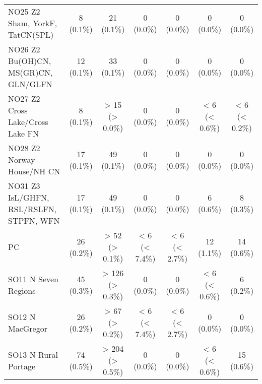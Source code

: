 \documentclass{article}
\begin{document}
\begin{table}[htbp]
\begin{longtable}{l*{6}{c}}
  NO25 Z2 Sham, YorkF, TatCN(SPL)                       &            8 (0.1\%)            &            21 (0.1\%)           &            0 (0.0\%)            &            0 (0.0\%)            &            0 (0.0\%)            &            0 (0.0\%)            \\
  NO26 Z2 Bu(OH)CN, MS(GR)CN, GLN/GLFN                  &            12 (0.1\%)           &            33 (0.1\%)           &            0 (0.0\%)            &            0 (0.0\%)            &            0 (0.0\%)            &            0 (0.0\%)            \\
  NO27 Z2 Cross Lake/Cross Lake FN                      &            8 (0.1\%)            &          > 15 (> 0.0\%)         &            0 (0.0\%)            &            0 (0.0\%)            &          < 6 (< 0.6\%)          &          < 6 (< 0.2\%)          \\
  NO28 Z2 Norway House/NH CN                            &            17 (0.1\%)           &            49 (0.1\%)           &            0 (0.0\%)            &            0 (0.0\%)            &            0 (0.0\%)            &            0 (0.0\%)            \\
  NO31 Z3 IsL/GHFN, RSL/RSLFN, STPFN, WFN               &            17 (0.1\%)           &            49 (0.1\%)           &            0 (0.0\%)            &            0 (0.0\%)            &            6 (0.6\%)            &            8 (0.3\%)            \\
  PC                                                    &            26 (0.2\%)           &          > 52 (> 0.1\%)         &          < 6 (< 7.4\%)          &          < 6 (< 2.7\%)          &            12 (1.1\%)           &            14 (0.6\%)           \\
  SO11 N Seven Regions                                  &            45 (0.3\%)           &         > 126 (> 0.3\%)         &            0 (0.0\%)            &            0 (0.0\%)            &          < 6 (< 0.6\%)          &            6 (0.2\%)            \\
  SO12 N MacGregor                                      &            26 (0.2\%)           &          > 67 (> 0.2\%)         &          < 6 (< 7.4\%)          &          < 6 (< 2.7\%)          &            0 (0.0\%)            &            0 (0.0\%)            \\
  SO13 N Rural Portage                                  &            74 (0.5\%)           &         > 204 (> 0.5\%)         &            0 (0.0\%)            &            0 (0.0\%)            &          < 6 (< 0.6\%)          &            15 (0.6\%)           \\

\end{longtable}
\end{table}
\end{document}
